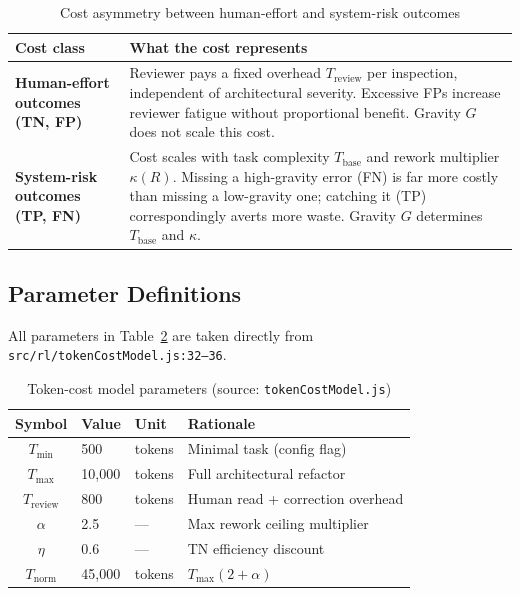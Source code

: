 \documentclass[conference]{IEEEtran}
\newcommand{\Tbase}{T_{\mathrm{base}}}
\newcommand{\Treview}{T_{\mathrm{review}}}
\newcommand{\Tnorm}{T_{\mathrm{norm}}}
\newcommand{\Tmin}{T_{\mathrm{min}}}
\newcommand{\Tmax}{T_{\mathrm{max}}}
\begin{document}
\begin{table}[!t]
  \caption{Cost asymmetry between human-effort and system-risk outcomes}
  \label{tab:cost_asymmetry}
  \renewcommand{\arraystretch}{1.2}
  \begin{tabular}{|>{\centering\bfseries\small}m{1.9cm}|
                   >{\small}m{5.6cm}|}
    \hline
    Cost class & What the cost represents \\
    \hline
    Human-effort outcomes (TN, FP) &
      Reviewer pays a fixed overhead $\Treview$ per inspection, independent
      of architectural severity.
      Excessive FPs increase reviewer fatigue without proportional benefit.
      Gravity $G$ does not scale this cost. \\
    \hline
    System-risk outcomes (TP, FN) &
      Cost scales with task complexity $\Tbase$ and rework multiplier
      $\kappa(R)$.
      Missing a high-gravity error (FN) is far more costly than missing a
      low-gravity one; catching it (TP) correspondingly averts more waste.
      Gravity $G$ determines $\Tbase$ and $\kappa$. \\
    \hline
  \end{tabular}
\end{table}

\subsection{Parameter Definitions}

All parameters in Table~\ref{tab:params} are taken directly from
\texttt{src/rl/tokenCostModel.js:32--36}.

\begin{table}[!t]
  \caption{Token-cost model parameters (source: \texttt{tokenCostModel.js})}
  \label{tab:params}
  \renewcommand{\arraystretch}{1.1}
  \begin{tabular}{@{}cllp{3.2cm}@{}}
    \toprule
    Symbol & Value & Unit & Rationale \\
    \midrule
    $\Tmin$    & 500      & tokens & Minimal task (config flag) \\
    $\Tmax$    & 10{,}000 & tokens & Full architectural refactor \\
    $\Treview$ & 800      & tokens & Human read + correction overhead \\
    $\alpha$   & 2.5      & ---    & Max rework ceiling multiplier \\
    $\eta$     & 0.6      & ---    & TN efficiency discount \\
    $\Tnorm$   & 45{,}000 & tokens & $\Tmax(2{+}\alpha)$ \\
    \bottomrule
  \end{tabular}
\end{table}
\end{document}
